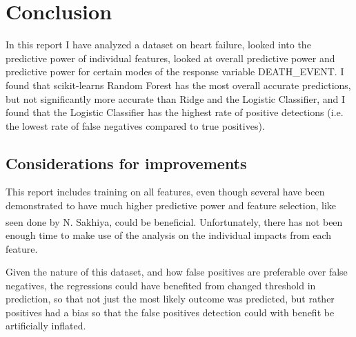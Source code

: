 \documentclass[a4paper, UKenglish]{article}
\newcommand{\0}{\mathbf{0}}
\newcommand{\1}{\mathbf{1}}
\newcommand{\citesup}[1]{\textsuperscript{\cite{#1}}}
\begin{document}
\section{Conclusion}
In this report I have analyzed a dataset on heart failure, looked into the predictive power of individual features, looked at overall predictive power and predictive power for certain modes of the response variable DEATH\_EVENT. I found that scikit-learns Random Forest has the most overall accurate predictions, but not significantly more accurate than Ridge and the Logistic Classifier, and I found that the Logistic Classifier has the highest rate of positive detections (i.e. the lowest rate of false negatives compared to true positives).

\subsection{Considerations for improvements}
This report includes training on all features, even though several have been demonstrated to have much higher predictive power and feature selection, like seen done by N. Sakhiya\citesup{nayan}, could be beneficial. Unfortunately, there has not been enough time to make use of the analysis on the individual impacts from each feature.

Given the nature of this dataset, and how false positives are preferable over false negatives, the regressions could have benefited from changed threshold  in prediction, so that not just the most likely outcome was predicted, but rather positives had a bias so that the false positives detection could with benefit be artificially inflated.



\newpage



\end{document}
